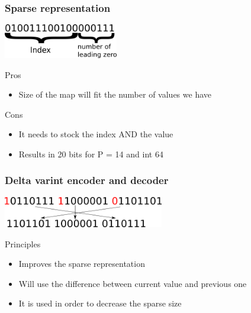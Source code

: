 \documentclass{beamer}
\begin{document}
\begin{frame}
\frametitle{Sparse representation}
	\begin{center}
		\includegraphics[width=5cm]{sparse.png} \\
	\end{center}
	\begin{block}{Pros}
		\begin{itemize}
			\item Size of the map will fit the number of values we have
		\end{itemize}
	\end{block}
	
	\begin{block}{Cons}
		\begin{itemize}
			\item It needs to stock the index AND the value
			\item Results in 20 bits for P = 14 and int 64
		\end{itemize}
	\end{block}
\end{frame}

\begin{frame}
\frametitle{Delta varint encoder and decoder}
	\begin{center}
		\includegraphics[width=7cm]{varint.png} \\
	\end{center}
	
	\begin{block}{Principles}
		\begin{itemize}
			\item Improves the sparse representation
			\item Will use the difference between current value and previous one
			\item It is used in order to decrease the sparse size
		\end{itemize}
	\end{block}
\end{frame}
\end{document}
